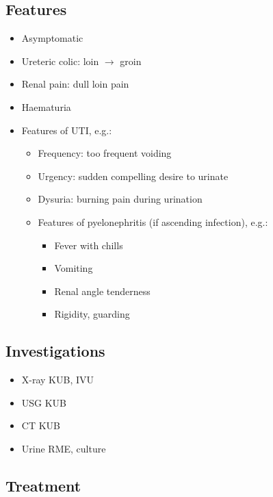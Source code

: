 \documentclass[
  14pt,
]{memoir}
\providecommand{\tightlist}{%
  \setlength{\itemsep}{0pt}\setlength{\parskip}{0pt}}
\begin{document}
\hypertarget{features-4}{%
\subsection{Features}\label{features-4}}

\begin{itemize}
\tightlist
\item
  Asymptomatic
\item
  Ureteric colic: loin \(\rightarrow\) groin
\item
  Renal pain: dull loin pain
\item
  Haematuria
\item
  Features of UTI, e.g.:

  \begin{itemize}
  \tightlist
  \item
    Frequency: too frequent voiding
  \item
    Urgency: sudden compelling desire to urinate
  \item
    Dysuria: burning pain during urination
  \item
    Features of pyelonephritis (if ascending infection), e.g.:

    \begin{itemize}
    \tightlist
    \item
      Fever with chills
    \item
      Vomiting
    \item
      Renal angle tenderness
    \item
      Rigidity, guarding
    \end{itemize}
  \end{itemize}
\end{itemize}

\hypertarget{investigations-4}{%
\subsection{Investigations}\label{investigations-4}}

\begin{itemize}
\tightlist
\item
  X-ray KUB, IVU
\item
  USG KUB
\item
  CT KUB
\item
  Urine RME, culture
\end{itemize}

\hypertarget{treatment-4}{%
\subsection{Treatment}\label{treatment-4}}
\end{document}
